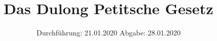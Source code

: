 

\subject{Versuch 201}
\title{Das Dulong Petitsche Gesetz}
\date{%
  Durchführung: 21.01.2020
  \hspace{3em}
  Abgabe: 28.01.2020
}



\maketitle

\thispagestyle{empty}
\tableofcontents
\newpage








\printbibliography{}


